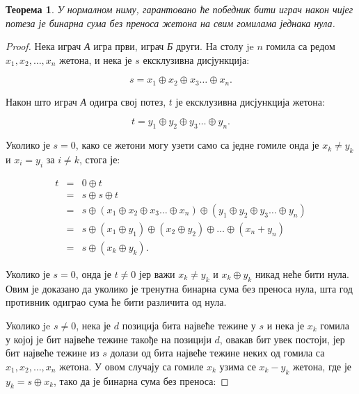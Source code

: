 \documentclass[a4paper]{article}
\newtheorem{theorem}{Теорема}
\begin{document}
\begin{theorem}
	\label{thm:pobeda}
	У нормалном ниму, гарантовано ће победник бити играч након чијег потеза је бинарна сума без преноса жетона на свим гомилама једнака нула.
\end{theorem}

\begin{proof}
	Нека играч \textit{А} игра први, играч \textit{Б} други. На столу je $ n $ гомила са редом $ x_{1}, x_{2}, \dots , x_{n} $ жетона, и нека је $ s $ ексклузивна дисјункција: 
	
	\begin{displaymath}
		s = x_{1} \oplus x_{2} \oplus x_{3} \ldots \oplus x_{n}.
	\end{displaymath}
	
	Након што играч \textit{А} одигра свој потез, $ t $ је ексклузивна дисјункција жетона:
	
	\begin{displaymath}
		t = y_{1} \oplus y_{2} \oplus y_{3} \ldots \oplus y_{n}.
	\end{displaymath}
	
	 Уколико је $ s = 0 $, како се жетони могу узети само са једне гомиле онда је $ x_{k} \neq y_{k} $ и $ x_{i} = y_{i} $ за $ i \neq k $, стога је:
	 
	 \begin{eqnarray*}
	 	t &=& 0 \oplus t \\
		  &=& s \oplus s \oplus t \\
		  &=& s \oplus (x_{1} \oplus x_{2} \oplus x_{3} \dots \oplus x_{n}) \oplus (y_{1} \oplus y_{2} \oplus y_{3} \dots \oplus y_{n}) \\
		  &=& s \oplus (x_{1} \oplus y_{1}) \oplus (x_{2} \oplus y_{2}) \oplus  \ldots \oplus (x_{n} + y_{n}) \\
		  &=& s \oplus (x_{k} \oplus y_{k}). 		 
	 \end{eqnarray*}
	 
	 Уколико је $ s = 0 $, онда је $ t \neq 0 $ јер важи $ x_{k} \neq y_{k} $ и $ x_{k} \oplus y_{k} $ никад неће бити нула. Овим је доказано да уколико је тренутна бинарна сума без преноса нула, шта год противник одиграо сума ће бити различита од нула.
	 
	 Уколико je $ s \neq 0 $, нека је $ d $ позиција бита највеће тежине у $ s $ и нека је $ x_{k} $ гомила у којој је бит највеће тежине такође на позицији $ d $, овакав бит увек постоји, јер бит највеће тежине из $ s $ долази од бита највеће тежине неких од гомила са $ x_{1}, x_{2}, \dots , x_{n} $ жетона. У овом случају са гомиле $ x_{k} $ узима се $ x_{k} - y_{k} $ жетона, где је $ y_{k} = s \oplus x_{k} $, тако да је бинарна сума без преноса:
	 

\end{proof}
\end{document}

